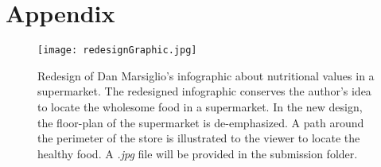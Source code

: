 \section{Appendix}

\begin{figure}[ht]
  \centering
	\texttt{[image: redesignGraphic.jpg]}
	\caption{Redesign of Dan Marsiglio's infographic about nutritional values in a
		supermarket. The redesigned infographic conserves the author's idea to
		locate the wholesome food in a supermarket. In the new design, the
		floor-plan of the supermarket is de-emphasized. A path around the perimeter
		of the store is illustrated to the viewer to locate the healthy food. A
		\textit{.jpg} file will be provided in the submission folder.}
	\label{redesignGraphic}
\end{figure}

